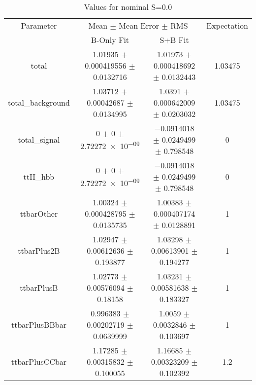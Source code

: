 \begin{table}
\centering
\caption{Values for nominal S=0.0}
\begin{tabular}{cccc}
\toprule
Parameter & \multicolumn{2}{c}{Mean $\pm$ Mean Error $\pm$ RMS} & Expectation\\
 & B-Only Fit & S+B Fit & \\
\midrule
total & \num{1.01935} $\pm$ \num{0.000419556} $\pm$ \num{0.0132716} & \num{1.01973} $\pm$ \num{0.000418692} $\pm$ \num{0.0132443} & \num{1.03475}\\
total\_background & \num{1.03712} $\pm$ \num{0.00042687} $\pm$ \num{0.0134995} & \num{1.0391} $\pm$ \num{0.000642009} $\pm$ \num{0.0203032} & \num{1.03475}\\
total\_signal & \num{0} $\pm$ \num{0} $\pm$ \num{2.72272e-09} & \num{-0.0914018} $\pm$ \num{0.0249499} $\pm$ \num{0.798548} & \num{0}\\
ttH\_hbb & \num{0} $\pm$ \num{0} $\pm$ \num{2.72272e-09} & \num{-0.0914018} $\pm$ \num{0.0249499} $\pm$ \num{0.798548} & \num{0}\\
ttbarOther & \num{1.00324} $\pm$ \num{0.000428795} $\pm$ \num{0.0135735} & \num{1.00383} $\pm$ \num{0.000407174} $\pm$ \num{0.0128891} & \num{1}\\
ttbarPlus2B & \num{1.02947} $\pm$ \num{0.00612636} $\pm$ \num{0.193877} & \num{1.03298} $\pm$ \num{0.00613901} $\pm$ \num{0.194277} & \num{1}\\
ttbarPlusB & \num{1.02773} $\pm$ \num{0.00576094} $\pm$ \num{0.18158} & \num{1.03231} $\pm$ \num{0.00581638} $\pm$ \num{0.183327} & \num{1}\\
ttbarPlusBBbar & \num{0.996383} $\pm$ \num{0.00202719} $\pm$ \num{0.0639999} & \num{1.0059} $\pm$ \num{0.0032846} $\pm$ \num{0.103697} & \num{1}\\
ttbarPlusCCbar & \num{1.17285} $\pm$ \num{0.00315832} $\pm$ \num{0.100055} & \num{1.16685} $\pm$ \num{0.00323209} $\pm$ \num{0.102392} & \num{1.2}\\
\bottomrule
\end{tabular}
\end{table}